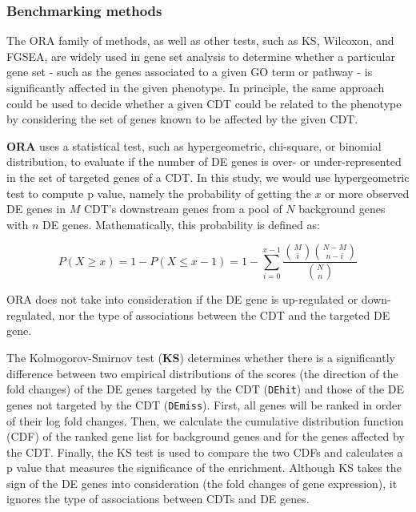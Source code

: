 \subsubsection{Benchmarking methods}

The ORA family of methods, as well as other tests, such as KS, Wilcoxon, and FGSEA, are widely used in gene set analysis to determine whether  a particular gene set - such as the genes associated to a given GO term or pathway - is significantly affected in the given phenotype. In principle, the same approach could be used to decide whether a given CDT could be related to the phenotype by considering the set of genes known to be affected by the given CDT. 

\textbf{ORA} uses a statistical test, such as hypergeometric, chi-square, or binomial distribution, to evaluate if the number of DE genes is over- or under-represented in the set of targeted genes of a CDT. In this study, we would use hypergeometric test to compute p value, namely the probability of getting the $x$ or more observed DE genes in $M$ CDT's downstream genes from a pool of $N$ background genes with $n$ DE genes. Mathematically, this probability is defined as:

\begin{equation*}
P(X \geq x) = 1-P(X \leq x -1)= 1- \sum_{i=0}^{x-1} \frac{\binom{M}{i}\binom{N-M}{n-i}}{\binom{N}{n}} 
\end{equation*}

ORA does not take into consideration if the DE gene is up-regulated or down-regulated, nor the type of associations between the CDT and the targeted DE gene.

The Kolmogorov-Smirnov test (\textbf{KS}) determines whether there is a significantly difference between two empirical distributions of the scores (the direction of the fold changes) of the DE genes targeted by the CDT (\texttt{DEhit}) and those of the DE genes not targeted by the CDT (\texttt{DEmiss}). First, all genes will be ranked in order of their log fold changes. Then, we calculate the cumulative distribution function (CDF) of the ranked gene list for background genes and for the genes affected by the CDT. Finally, the KS test is used to compare the two CDFs and calculates a p value that measures the significance of the enrichment. Although KS takes the sign of the DE genes into consideration (the fold changes of gene expression), it ignores the type of associations between CDTs and DE genes.

